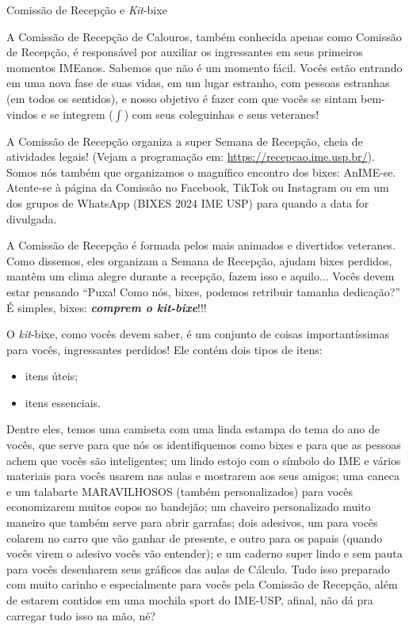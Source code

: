 \begin{secao}{Comissão de Recepção e \textit{Kit}-bixe}

A Comissão de Recepção de Calouros, também conhecida apenas como Comissão de
Recepção, é responsável por auxiliar os ingressantes em seus primeiros momentos
IMEanos. Sabemos que não é um momento fácil. Vocês estão entrando em uma nova fase
de suas vidas, em um lugar estranho, com pessoas estranhas (em todos os sentidos),
e nosso objetivo é fazer com que vocês se sintam bem-vindos e se integrem
($\int$) com seus coleguinhas e seus veteranes!

A Comissão de Recepção organiza a super Semana de Recepção, cheia de atividades
legais! (Vejam a programação em: \url{https://recepcao.ime.usp.br/}).
Somos nós também que organizamos o magnífico encontro dos bixes: AnIME-se.
Atente-se à página da Comissão no Facebook, TikTok ou Instagram ou em um dos
grupos de WhatsApp (BIXES 2024 IME USP) para quando a data for divulgada. %

A Comissão de Recepção é formada pelos mais animados e divertidos veteranes. Como
dissemos, eles organizam a Semana de Recepção, ajudam bixes perdidos, mantêm um clima
alegre durante a recepção, fazem isso e aquilo...
Vocês devem estar pensando ``Puxa! Como nós, bixes, podemos retribuir
tamanha dedicação?'' É simples, bixes: {\bf\em comprem o \textit{kit}-bixe}!!!

O \textit{kit}-bixe, como vocês devem saber, é um conjunto de coisas
importantíssimas para vocês, ingressantes perdidos! Ele contém dois tipos de
itens:
\begin{itemize}
\item itens úteis;
\item itens essenciais.
\end{itemize} %
Dentre eles, temos uma camiseta com uma linda estampa do tema do ano de vocês,
que serve para que nós os identifiquemos como bixes e para que as pessoas
achem que vocês são inteligentes; um lindo estojo com o símbolo do IME e vários 
materiais para vocês usarem nas aulas e mostrarem aos seus amigos; uma caneca e 
um talabarte MARAVILHOSOS (também personalizados) para vocês economizarem muitos 
copos no bandejão; um chaveiro personalizado muito maneiro que também serve para 
abrir garrafas; dois adesivos, um para vocês colarem no carro que vão ganhar de 
presente, e outro para os papais (quando vocês virem o adesivo vocês vão entender); 
e um caderno super lindo e sem pauta para vocês desenharem seus gráficos das aulas 
de Cálculo. Tudo isso preparado com muito carinho e especialmente para vocês pela 
Comissão de Recepção, além de estarem contidos em uma mochila sport do IME-USP, 
afinal, não dá pra carregar tudo isso na mão, né?


\end{secao}
